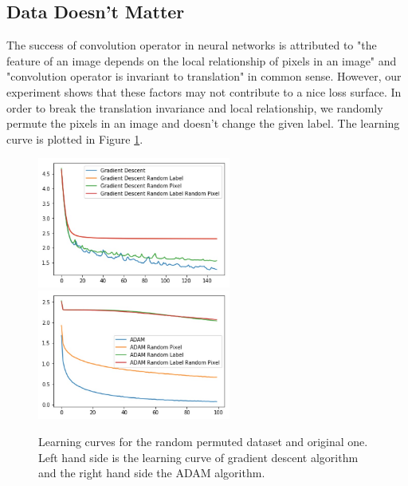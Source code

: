 \documentclass{article}
\theoremstyle{plain}
\theoremstyle{definition}
\begin{document}


\subsection{Data Doesn't Matter}

The success of convolution operator in neural networks is attributed to "the feature of an image depends on the local relationship of pixels in an image" and "convolution operator is invariant to translation" in common sense. However, our experiment shows that these factors may not contribute to a nice loss surface. In order to break the translation invariance and local relationship, we randomly permute the pixels in an image and doesn't change the given label. The learning curve is plotted in Figure \ref{randomperb}.

\begin{figure}[htp]
	\centering
	\includegraphics[width=2.5in]{gdrp.jpg}
	\includegraphics[width=2.5in]{adamrp.jpg}
	\caption{Learning curves for the random permuted dataset and original one. Left hand side is the learning curve of gradient descent algorithm and the right hand side the ADAM algorithm.}
	\label{randomperb}
\end{figure}
\end{document}
